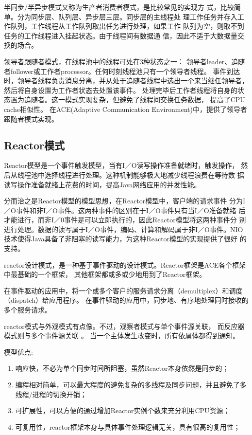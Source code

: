 半同步/半异步模式又称为生产者消费者模式，是比较常见的实现方
式，比较简单。分为同步层、队列层、异步层三层。同步层的主线程处
理工作任务并存入工作队列，工作线程从工作队列取出任务进行处理，如果工作
队列为空，则取不到任务的工作线程进入挂起状态。由于线程间有数据通
信，因此不适于大数据量交换的场合。

领导者跟随者模式，在线程池中的线程可处在3种状态之一：
领导者leader、追随者follower或工作者processor。任何时刻线程池只有一个领导者线程。
事件到达时，领导者线程负责消息分离，并从处于追随者线程中选出一个来当继任领导者，
然后将自身设置为工作者状态去处置该事件。
处理完毕后工作者线程将自身的状态置为追随者。这一模式实现复杂，但避免了线程间交换任务数据，
提高了CPU cache相似性。
在ACE(Adaptive Communication Environment)中，提供了领导者跟随者模式实现。
\subsection{Reactor模式}
Reactor模型是一个事件触发模型，当有I／O读写操作准备就绪时，触发操作，
然后从线程池中选择线程进行处理。这种机制能够极大地减少线程浪费在等待数
据读写操作准备就绪上花费的时间，提高Java网络应用的并发性能。

分而治之是Reactor模型的模型思想，在Reactor模型中，客户端的请求事件
分为I／O事件和非I／O事件。这两种事件的区别在于I／O事件只有当I／O准备就绪
后才能进行，而非I／0事件是可以立即执行的，因此Reactor模型将这两种事件分
别进行处理。数据的读写属于I／O事件，编码、计算和解码属于非I／O事件。NIO
技术使得Java具备了非阻塞的读写能力，为这种Reactor模型的实现提供了很好
的支持。

reactor设计模式，是一种基于事件驱动的设计模式。Reactor框架是ACE各个框架中最基础的一个框架，
其他框架都或多或少地用到了Reactor框架。 

在事件驱动的应用中，将一个或多个客户的服务请求分离（demultiplex）和调度（dispatch）给应用程序。
在事件驱动的应用中，同步地、有序地处理同时接收的多个服务请求。 

reactor模式与外观模式有点像。不过，观察者模式与单个事件源关联，
而反应器模式则与多个事件源关联 。
当一个主体发生改变时，所有依属体都得到通知。
\noindent

\noindent
模型优点:
\begin{enumerate}
	\item 响应快，不必为单个同步时间所阻塞，虽然Reactor本身依然是同步的；
	\item 编程相对简单，可以最大程度的避免复杂的多线程及同步问题，并且避免了多线程/进程的切换开销； 
	\item 可扩展性，可以方便的通过增加Reactor实例个数来充分利用CPU资源； 
	\item 可复用性，reactor框架本身与具体事件处理逻辑无关，具有很高的复用性；
\end{enumerate}
\noindent

